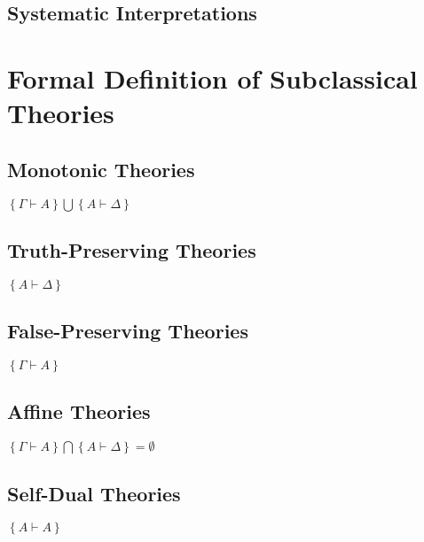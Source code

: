 \documentclass{article}
\begin{document}
\begin{center}
		\subsection{Systematic Interpretations}
	\section{Formal Definition of Subclassical Theories}
		\subsection{Monotonic Theories}
		$\left\{ Γ ⊢ A \right\} \bigcup \left\{ A ⊢ Δ \right\}$
		\subsection{Truth-Preserving Theories}
		$\left\{ A ⊢ Δ \right\}$
		\subsection{False-Preserving Theories}
		$\left\{ Γ ⊢ A \right\}$
		\subsection{Affine Theories}
		$\left\{ Γ ⊢ A \right\} \bigcap \left\{ A ⊢ Δ \right\}=\emptyset$
		\subsection{Self-Dual Theories}
		$\left\{ A ⊢ A \right\}$
	
\end{center}
\end{document}
